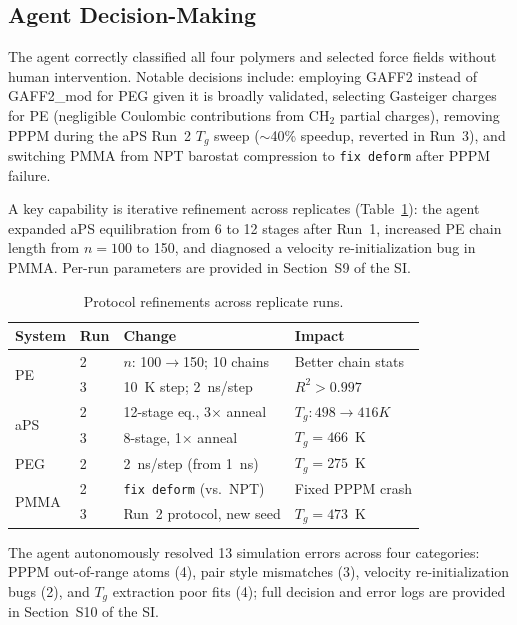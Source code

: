 \documentclass[journal=acsami,manuscript=article]{achemso}
\begin{document}
\subsection{Agent Decision-Making}
\label{sec:agent_decisions}

The agent correctly classified all four polymers and selected force fields without human intervention.
Notable decisions include: employing GAFF2\cite{wang2004gaff} 
instead of GAFF2\_mod\cite{trag2019gaff2mod} for PEG given it is broadly validated, selecting Gasteiger charges for PE (negligible Coulombic contributions from CH$_2$ partial charges), removing PPPM during the aPS Run~2 $T_g$ sweep ($\sim$40\% speedup, reverted in Run~3), and switching PMMA from NPT barostat compression to \texttt{fix deform} after PPPM failure.

A key capability is iterative refinement across replicates (Table~\ref{tab:protocol_evolution}): the agent expanded aPS equilibration from 6 to 12 stages after Run~1, increased PE chain length from $n = 100$ to 150, and diagnosed a velocity re-initialization bug in PMMA.
Per-run parameters are provided in Section~S9 of the SI.

\begin{table}[ht]
\centering
\caption{Protocol refinements across replicate runs.}
\label{tab:protocol_evolution}
\small
\begin{tabular}{@{}llp{3.2cm}l@{}}
\toprule
\textbf{System} & \textbf{Run} & \textbf{Change} & \textbf{Impact} \\
\midrule
\multirow{2}{*}{PE} & 2 & $n$: 100$\to$150; 10 chains & Better chain stats \\
& 3 & 10~K step; 2~ns/step & $R^2 > 0.997$ \\
\midrule
\multirow{2}{*}{aPS} & 2 & 12-stage eq., 3$\times$ anneal & $T_g:498 \to 416K$  \\
& 3 & 8-stage, 1$\times$ anneal & $T_g = 466$~K \\
\midrule
PEG & 2 & 2~ns/step (from 1~ns) & $T_g = 275$~K \\
\midrule
\multirow{2}{*}{PMMA} & 2 & \texttt{fix deform} (vs.\ NPT) & Fixed PPPM crash \\
& 3 & Run~2 protocol, new seed & $T_g = 473$~K \\
\bottomrule
\end{tabular}
\end{table}

The agent autonomously resolved 13 simulation errors across four categories: PPPM out-of-range atoms (4), pair style mismatches (3), velocity re-initialization bugs (2), and $T_g$ extraction poor fits (4); full decision and error logs are provided in Section~S10 of the SI.
\end{document}
